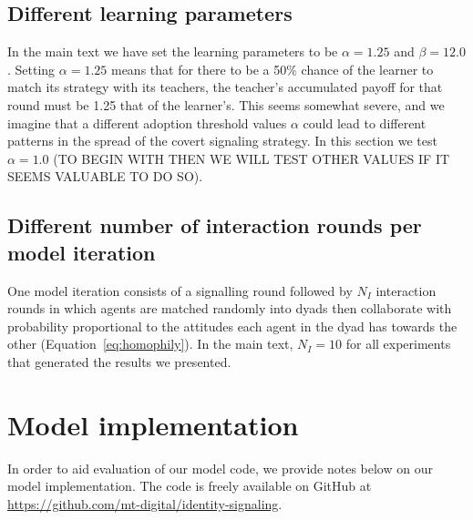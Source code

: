 \documentclass[11pt,letterpaper]{article}
\begin{document}
\subsection{Different learning parameters}

In the main text we have set the learning parameters to be $\alpha=1.25$ and
$\beta=12.0$. Setting $\alpha=1.25$ means that for there to be a 50\% chance
of the learner to match its strategy with its teachers, the teacher's 
accumulated payoff for that round must be 1.25 that of the learner's. This
seems somewhat severe, and we imagine that a different adoption threshold values
$\alpha$ could lead to different patterns in the spread of the covert signaling
strategy. In this section we test $\alpha=1.0$ (TO BEGIN WITH THEN WE WILL TEST
OTHER VALUES IF IT SEEMS VALUABLE TO DO SO).


\subsection{Different number of interaction rounds per model iteration}

One model iteration consists of a signalling round followed by $N_I$ interaction
rounds in which agents are matched randomly into dyads then collaborate 
with probability proportional to the attitudes each agent in the dyad has towards
the other (Equation~\ref{eq:homophily}). In the main text, $N_I = 10$ for
all experiments that generated the results we presented. 

\section{Model implementation}

In order to aid evaluation of our model code, we provide notes below on 
our model implementation. The code is freely available on GitHub at
\url{https://github.com/mt-digital/identity-signaling}.
\end{document}
